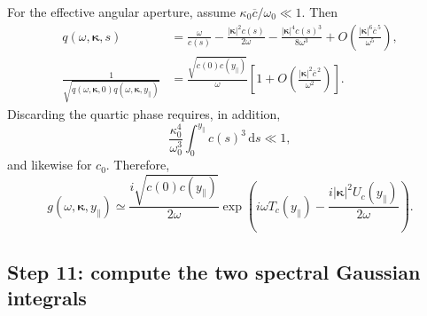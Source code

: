 \documentclass[11pt]{article}
\newcommand{\bkappa}{\boldsymbol{\kappa}}
\newcommand{\dd}{\,\mathrm{d}}
\begin{document}
For the effective angular aperture, assume
$\kappa_0\overline c/\omega_0\ll1$. Then
\begin{align}
q(\omega,\bkappa,s)
&=\frac{\omega}{c(s)}
-\frac{|\bkappa|^2c(s)}{2\omega}
-\frac{|\bkappa|^4c(s)^3}{8\omega^3}
+O\!\left(\frac{|\bkappa|^6\overline c^{\,5}}{\omega^5}\right),\\
\frac{1}{\sqrt{q(\omega,\bkappa,0)q(\omega,\bkappa,y_\parallel)}}
&=\frac{\sqrt{c(0)c(y_\parallel)}}{\omega}
\left[1+O\!\left(\frac{|\bkappa|^2\overline c^{\,2}}{\omega^2}\right)\right].
\end{align}
Discarding the quartic phase requires, in addition,
\begin{equation}
\frac{\kappa_0^4}{\omega_0^3}
\int_0^{y_\parallel}c(s)^3\dd s\ll1,
\label{eq:plane-paraxial-phase}
\end{equation}
and likewise for $c_0$. Therefore,
\begin{equation}
g(\omega,\bkappa,y_\parallel)
\simeq\frac{i\sqrt{c(0)c(y_\parallel)}}{2\omega}
\exp\!\left(i\omega T_c(y_\parallel)
-\frac{i|\bkappa|^2U_c(y_\parallel)}{2\omega}\right).
\label{eq:g-paraxial}
\end{equation}

\subsection{Step 11: compute the two spectral Gaussian integrals}
\end{document}
